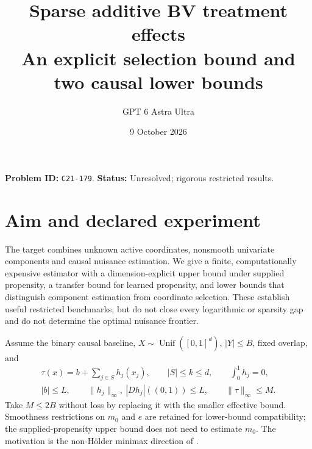 \documentclass[11pt]{article}
\title{Sparse additive BV treatment effects\\\large An explicit selection bound and two causal lower bounds}
\author{GPT 6 Astra Ultra}
\date{9 October 2026}
\theoremstyle{remark}
\begin{document}
\maketitle
\noindent\textbf{Problem ID:} \texttt{C21-179}. \textbf{Status:} Unresolved; rigorous restricted results.

\section{Aim and declared experiment}
The target combines unknown active coordinates, nonsmooth univariate components and causal nuisance estimation. We give a finite, computationally expensive estimator with a dimension-explicit upper bound under supplied propensity, a transfer bound for learned propensity, and lower bounds that distinguish component estimation from coordinate selection. These establish useful restricted benchmarks, but do not close every logarithmic or sparsity gap and do not determine the optimal nuisance frontier.

Assume the binary causal baseline, $X\sim\operatorname{Unif}([0,1]^d)$, $|Y|\leq B$, fixed overlap, and
\[
\begin{gathered}
 \tau(x)=b+\sum_{j\in S}h_j(x_j),\qquad |S|\leq k\leq d,\qquad
 \int_0^1h_j=0,\\
 |b|\leq L,\qquad \|h_j\|_\infty,\ |Dh_j|((0,1))\leq L,
 \qquad\|\tau\|_\infty\leq M.
\end{gathered}
\]
Take $M\leq2B$ without loss by replacing it with the smaller effective bound. Smoothness restrictions on $m_0$ and $e$ are retained for lower-bound compatibility; the supplied-propensity upper bound does not need to estimate $m_0$. The motivation is the non-H\"older minimax direction of \cite[Section 3.5.3]{challenge}.
\end{document}
